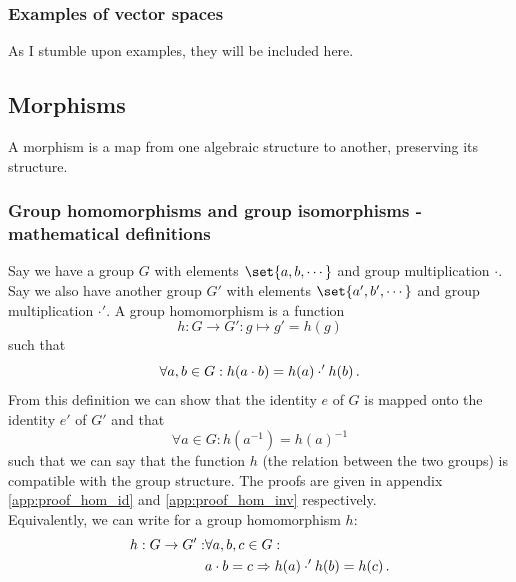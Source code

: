        \subsubsection{Examples of vector spaces}
            As I stumble upon examples, they will be included here.

    \subsection{Morphisms}
        A morphism is a map from one algebraic structure to another, preserving its structure.

        \subsubsection{Group homomorphisms and group isomorphisms - mathematical definitions}
            Say we have a group $G$ with elements $\set{a, b, \cdots}$ and group multiplication $\cdot$. Say we also have another group $G'$ with elements $\set{a', b', \cdots}$ and group multiplication $\cdot'$. A group homomorphism is a function
            \begin{equation}
               h: G \rightarrow G': g \mapsto g' = h(g)
            \end{equation}
            such that
            \begin{equation}
               \forall a, b \in G: h(a \cdot b) = h(a) \cdot' h(b) \thinspace .
            \end{equation}
            From this definition we can show that the identity $e$ of $G$ is mapped onto the identity $e'$ of $G'$ and that
            \begin{equation}
               \forall a \in G: h(a^{-1}) = h(a)^{-1}
            \end{equation}
            such that we can say that the function $h$ (the relation between the two groups) is compatible with the group structure. The proofs are given in appendix \ref{app:proof_hom_id} and \ref{app:proof_hom_inv} respectively. \\

            Equivalently, we can write for a group homomorphism $h$:
            \begin{align}
                h: G \rightarrow G': &\forall a, b, c \in G: \\
                &a \cdot b = c \Rightarrow h(a) \cdot' h(b) = h(c) \thinspace .
            \end{align}

